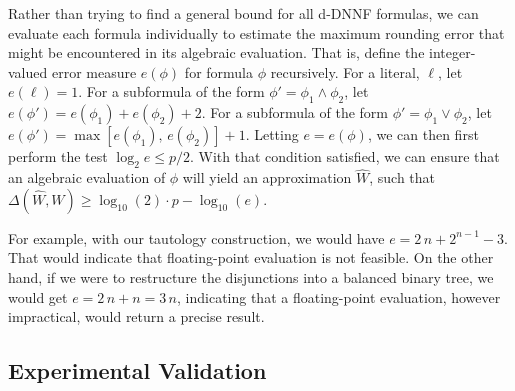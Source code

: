 \documentclass[letterpaper,USenglish,cleveref, autoref, thm-restate]{lipics-v2021}
\newcommand{\lit}{\ell}
\newcommand{\approximate}[1]{\hat{#1}}
\newcommand{\approxW}{\approximate{W}}
\newcommand{\digitprecision}{\Delta}
\begin{document}

Rather than trying to find a general bound for all d-DNNF formulas, we
can evaluate each formula individually to estimate the maximum
rounding error that might be encountered in its algebraic evaluation.  That is,
define the integer-valued error measure $e(\phi)$ for formula $\phi$
recursively.  For a literal, $\lit$, let $e(\lit) = 1$.
For a subformula of the form $\phi' = \phi_1 \land \phi_2$, let $e(\phi') = e(\phi_1) + e(\phi_2) + 2$.
For a subformula of the form $\phi'= \phi_1 \lor \phi_2$, let $e(\phi') = \max[e(\phi_1),\, e(\phi_2)] + 1$.
Letting $e = e(\phi)$, we can then first perform the test $\log_2 e \leq p/2$.  With that condition satisfied,
we can ensure that an algebraic evaluation of $\phi$ will yield an approximation $\approxW$, such that
$\digitprecision(\approxW, W) \geq \log_{10}(2)\cdot p - \log_{10}(e)$.

For example, with our tautology construction, we would have $e = 2\,n
+ 2^{n-1} -3$. That would indicate that floating-point
evaluation is not feasible.  On the other hand, if we were to
restructure the disjunctions into a balanced binary tree, we would get
$e = 2\,n + n = 3\,n$, indicating that a floating-point evaluation, however impractical, would
return a precise result.


\subsection{Experimental Validation}
\end{document}
